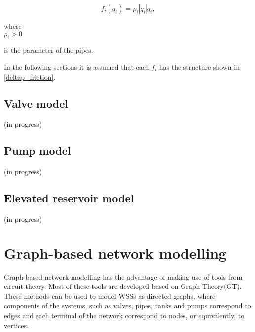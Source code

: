 \begin{equation}
  \label{deltap_friction}
  f_i(q_i) = \rho_i |q_i|q_i,
\end{equation}

 \begin{minipage}[t]{0.20\textwidth}
where\\
\hspace*{8mm} $\rho_i > 0$ 
\end{minipage}
\begin{minipage}[t]{0.68\textwidth}
\vspace*{2mm}
is the parameter of the pipes. 
\end{minipage}

In the following sections it is assumed that each $f_i$ has the structure shown in \eqref{deltap_friction}. 

\subsection{Valve model}
\label{valve_component}

(in progress)

\subsection{Pump model}
\label{pump_component}

(in progress)

\subsection{Elevated reservoir model}
\label{elevatedreservoir_component}

(in progress)

\section{Graph-based network modelling}
\label{graph_based_network_modelling}

Graph-based network modelling has the advantage of making use of tools from circuit theory. Most of these tools are developed based on Graph Theory(GT). These methods can be used to model WSSs as directed graphs, where components of the systems, such as valves, pipes, tanks and pumps correspond to edges and each terminal of the network correspond to nodes, or equivalently, to vertices.

